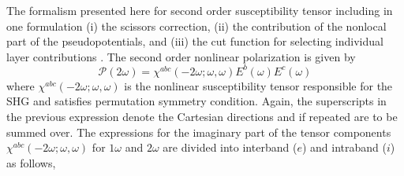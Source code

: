 \documentclass[pss]{wiley2sp} %
\begin{document}
The formalism presented here for second order susceptibility tensor including
in one formulation (i) the scissors correction, (ii) the contribution of the
nonlocal part of the pseudopotentials, and (iii) the cut function for
selecting individual layer contributions \cite{andersonPRB15}. The second
order nonlinear polarization is given by
\begin{equation*}\label{eq:pol}
\mathcal{P}(2\omega) = 
\chi^{abc}(-2\omega;\omega,\omega)E^{b}(\omega)E^{c}(\omega)
\end{equation*}
where $\chi^{abc}(-2\omega;\omega,\omega)$ is the nonlinear susceptibility
tensor responsible for the SHG and satisfies permutation symmetry condition.
Again, the superscripts in the previous expression denote the Cartesian
directions and if repeated are to be summed over. The expressions for the
imaginary part of the tensor components $\chi^{abc}(-2\omega;\omega,\omega)$
for $1\omega$ and $2\omega$ are divided into interband ($e$) and intraband
($i$) as follows,
\end{document}
